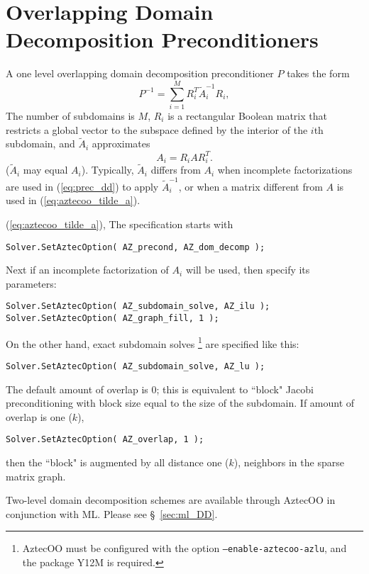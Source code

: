 \section{Overlapping Domain Decomposition Preconditioners}
\label{sec:aztecoo_dd}
A one level overlapping domain decomposition preconditioner $P$ takes the form
\begin{equation}
  \label{eq:prec_dd}
  P^{-1} = \sum_{i=1}^M R_i^T \tilde{A}_i^{-1} R_i,
\end{equation}
The number of subdomains is $M$, 
$R_i$ is a rectangular Boolean matrix that restricts
a global vector to the subspace defined by the interior of the $i$th
subdomain, and $\tilde{A}_i$ approximates
\begin{equation}
  \label{eq:aztecoo_tilde_a}
  A_i = R_i A R_i^T .
\end{equation}
($\tilde{A}_i$ may equal $A_i$). Typically, $\tilde{A}_i$ differs
from $A_i$ when incomplete factorizations are used in (\ref{eq:prec_dd})
to apply $\tilde{A}_i^{-1}$, or when a matrix different from $A$ is used
in (\ref{eq:aztecoo_tilde_a}).

(\ref{eq:aztecoo_tilde_a}),
The specification starts with
\begin{verbatim}
Solver.SetAztecOption( AZ_precond, AZ_dom_decomp );
\end{verbatim}
Next if an incomplete factorization of $A_i$ will be used, then specify its parameters:
\begin{verbatim}
Solver.SetAztecOption( AZ_subdomain_solve, AZ_ilu );
Solver.SetAztecOption( AZ_graph_fill, 1 );
\end{verbatim}
On the other hand, exact subdomain solves 
\footnote{AztecOO must be
  configured with the option {\tt --enable-aztecoo-azlu}, and the
  package Y12M is required.}
are specified like this:
\begin{verbatim}
Solver.SetAztecOption( AZ_subdomain_solve, AZ_lu );
\end{verbatim}

The default amount of overlap is $0$; this is equivalent to
``block" Jacobi preconditioning with block size equal to the size of the subdomain. 
If amount of overlap is one ($k$),
\begin{verbatim}
Solver.SetAztecOption( AZ_overlap, 1 );
\end{verbatim}
then the ``block" is augmented by all distance one ($k$),
neighbors in the sparse matrix graph.

\begin{remark} 
  Two-level domain decomposition schemes \cite{smbg:96}
are available through AztecOO in conjunction with ML.
Please see \S~\ref{sec:ml_DD}.
\end{remark}

